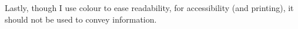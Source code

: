 Lastly, though I use colour to ease readability, for accessibility (and
printing), it should not be used to convey information.

\endgroup


\cleardoubleevenemptypage{}


\begingroup %

\hypersetup{allcolors=.}

\setlength{\textheight}{230\vscale} %

\etocstandarddisplaystyle%
\etocstandardlines%
\setcounter{tocdepth}{\sectiontocdepth} %

\tableofcontents %

\setcounter{tocdepth}{\subsectiontocdepth} %




\endgroup
{}
